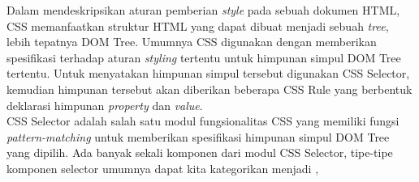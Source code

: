 \documentclass[12pt,a4paper]{article}
\begin{document}
Dalam mendeskripsikan aturan pemberian \textit{style} pada sebuah dokumen HTML, CSS memanfaatkan struktur HTML yang dapat dibuat menjadi sebuah \textit{tree}, lebih tepatnya DOM Tree.
Umumnya CSS digunakan dengan memberikan spesifikasi terhadap aturan \textit{styling} tertentu untuk himpunan simpul DOM Tree tertentu.
Untuk menyatakan himpunan simpul tersebut digunakan CSS Selector, kemudian himpunan tersebut akan diberikan beberapa CSS Rule yang berbentuk deklarasi himpunan \textit{property} dan \textit{value}. \cite{mozilla-css} \\

CSS Selector adalah salah satu modul fungsionalitas CSS yang memiliki fungsi \textit{pattern-matching} untuk memberikan spesifikasi himpunan simpul DOM Tree yang dipilih.
Ada banyak sekali komponen dari modul CSS Selector, tipe-tipe komponen selector umumnya dapat kita kategorikan menjadi \cite{mozilla-selector},
\end{document}
